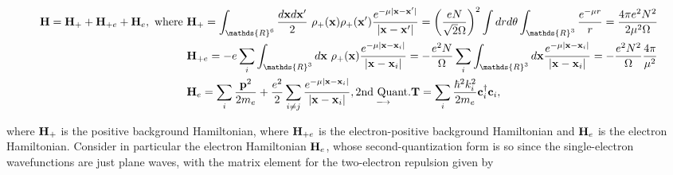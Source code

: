 \begin{equation}
\begin{split}
    {\bf H}= {\bf H}_{+} + {\bf H}_{+e} + {\bf H}_{e}, \textnormal{ where } 
         & {\bf H}_+ = \int_{\mathds{R}^6} \frac{d{\bf x} d{\bf x}'}{2} \blanky \rho_{+}({\bf x}) \rho_{+}({\bf x}') \frac{e^{-\mu |{\bf x}-{\bf x}'|}}{|{\bf x} - {\bf x}'|} = \bigg(\frac{eN}{\sqrt{2}\Omega}\bigg)^2 \int dr d\theta \int_{\mathds{R}^3} \frac{e^{-{\mu} r}}{r} = \frac{4\pi e^2 N^2}{2\mu^2\Omega}\\
         &{\bf H}_{+e} = - e\sum_{i} \int_{\mathds{R}^3} d{\bf x} \blanky \rho_{+}({\bf x}) \frac{e^{-\mu |{\bf x}-{\bf x}_i|}}{|{\bf x}-{\bf x}_i|} = -\frac{e^2 N}{\Omega} \sum_{i} \int_{\mathds{R}^3} d{\bf x} \frac{e^{-\mu |{\bf x}-{\bf x}_i|}}{|{\bf x}-{\bf x}_i|} = - \frac{e^2 N^2}{\Omega} \frac{4\pi}{\mu^2}\\
         &{\bf H}_e = \sum_{i} \frac{{\bf p}^2}{2m_e} + \frac{e^2}{2} \sum_{i\neq j}\frac{e^{-\mu |{\bf x}-{\bf x}_i|}}{|{\bf x}-{\bf x}_i|}, \underset{\longrightarrow}{\textnormal{2nd Quant.}} {\bf T} = \sum_{i} \frac{\hbar^2 k_i^2}{2m_e} {\bf c}_i^\dagger {\bf c}_i,
\end{split}
\end{equation}

where ${\bf H}_+$ is the positive background Hamiltonian, where ${\bf H}_{+e}$ is the electron-positive background Hamiltonian and ${\bf H}_e$ is the electron Hamiltonian. Consider in particular the electron Hamiltonian ${\bf H}_e$, whose second-quantization form is so since the single-electron wavefunctions are just plane waves, with the matrix element for the two-electron repulsion given by 


